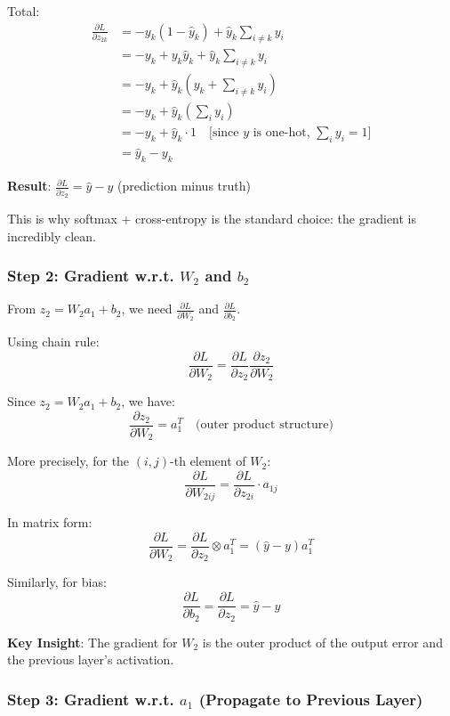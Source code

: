 \documentclass[11pt,oneside]{book}
\begin{document}
Total:
\begin{align*}
\frac{\partial L}{\partial z_{2k}} &= -y_k(1 - \hat{y}_k) + \hat{y}_k \sum_{i \neq k} y_i \\
&= -y_k + y_k \hat{y}_k + \hat{y}_k \sum_{i \neq k} y_i \\
&= -y_k + \hat{y}_k\left(y_k + \sum_{i \neq k} y_i\right) \\
&= -y_k + \hat{y}_k \left(\sum_i y_i\right) \\
&= -y_k + \hat{y}_k \cdot 1 \quad \text{[since } y \text{ is one-hot, } \sum_i y_i = 1\text{]} \\
&= \hat{y}_k - y_k
\end{align*}

\textbf{Result}: $\frac{\partial L}{\partial z_2} = \hat{y} - y$ (prediction minus truth)

This is why softmax + cross-entropy is the standard choice: the gradient is incredibly clean.

\subsubsection{Step 2: Gradient w.r.t. $W_2$ and $b_2$}

From $z_2 = W_2 a_1 + b_2$, we need $\frac{\partial L}{\partial W_2}$ and $\frac{\partial L}{\partial b_2}$.

Using chain rule:
\[
\frac{\partial L}{\partial W_2} = \frac{\partial L}{\partial z_2} \frac{\partial z_2}{\partial W_2}
\]

Since $z_2 = W_2 a_1 + b_2$, we have:
\[
\frac{\partial z_2}{\partial W_2} = a_1^T \quad \text{(outer product structure)}
\]

More precisely, for the $(i,j)$-th element of $W_2$:
\[
\frac{\partial L}{\partial W_{2ij}} = \frac{\partial L}{\partial z_{2i}} \cdot a_{1j}
\]

In matrix form:
\[
\frac{\partial L}{\partial W_2} = \frac{\partial L}{\partial z_2} \otimes a_1^T = (\hat{y} - y) a_1^T
\]

Similarly, for bias:
\[
\frac{\partial L}{\partial b_2} = \frac{\partial L}{\partial z_2} = \hat{y} - y
\]

\textbf{Key Insight}: The gradient for $W_2$ is the outer product of the output error and the previous layer's activation.

\subsubsection{Step 3: Gradient w.r.t. $a_1$ (Propagate to Previous Layer)}
\end{document}
